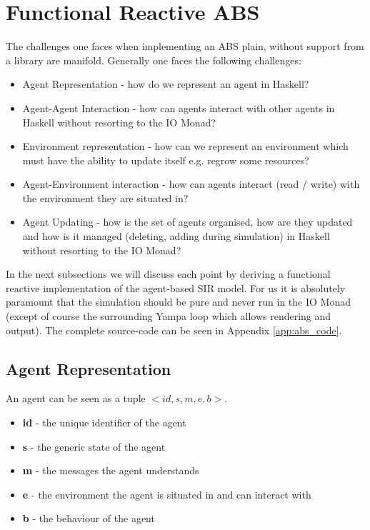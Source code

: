 \section{Functional Reactive ABS}

The challenges one faces when implementing an ABS plain, without support from a library are manifold. Generally one faces the following challenges:

\begin{itemize}
	\item Agent Representation - how do we represent an agent in Haskell?
	\item Agent-Agent Interaction - how can agents interact with other agents in Haskell without resorting to the IO Monad?
	\item Environment representation - how can we represent an environment which must have the ability to update itself e.g. regrow some resources?
	\item Agent-Environment interaction - how can agents interact (read / write) with the environment they are situated in?
	\item Agent Updating - how is the set of agents organised, how are they updated and how is it managed (deleting, adding during simulation) in Haskell without resorting to the IO Monad?
\end{itemize}

In the next subsections we will discuss each point by deriving a functional reactive implementation of the agent-based SIR model. For us it is absolutely paramount that the simulation should be pure and never run in the IO Monad (except of course the surrounding Yampa loop which allows rendering and output). The complete source-code can be seen in Appendix \ref{app:abs_code}.

\subsection{Agent Representation}
An agent can be seen as a tuple $<id, s, m, e, b>$.
\begin{itemize}
	\item \textbf{id} - the unique identifier of the agent
	\item \textbf{s} - the generic state of the agent
	\item \textbf{m} - the messages the agent understands
	\item \textbf{e} - the environment the agent is situated in and can interact with
	\item \textbf{b} - the behaviour of the agent
\end{itemize}

